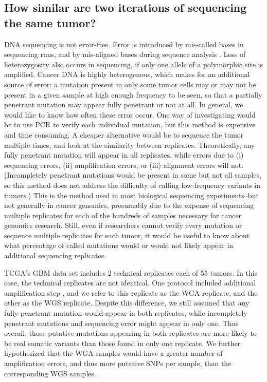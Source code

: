 \documentclass[11pt]{article} %
\begin{document}
\subsection*{How similar are two iterations of sequencing the same tumor?}


DNA sequencing is not error-free. Error is introduced by mis-called bases in sequencing runs, and by mis-aligned bases during sequence analysis \citep{seqerror}. Loss of heterozygosity also occurs in sequencing, if only one allele of a polymorphic site is amplified. Cancer DNA is highly heterogenous, which makes for an additional source of error: a mutation present in only some tumor cells may or may not be present in a given sample at high enough frequency to be seen, so that a partially penetrant mutation may appear fully penetrant or not at all. In general, we would like to know how often these error occur. One way of investigating would be to use PCR to verify each individual mutation, but this method is expensive and time consuming. A cheaper alternative would be to sequence the tumor multiple times, and look at the similarity between replicates. Theoretically, any fully penetrant mutation will appear in all replicates, while errors due to (i) sequencing errors, (ii) amplification errors, or (iii) alignment errors will not. (Incompletely penetrant mutations would be present in some but not all samples, so this method does not address the difficulty of calling low-frequency variants in tumors.) This is the method used in most biological sequencing experiments--but not generally in cancer genomics, presumably due to the expense of sequencing multiple replicates for each of the hundreds of samples necessary for cancer genomics research. Still, even if researchers cannot verify every mutation or sequence multiple replicates for each tumor, it would be useful to know about what percentage of called mutations would or would not likely appear in additional sequencing replicates.

TCGA's GBM data set includes 2 technical replicates each of 55 tumors. In this case, the technical replicates are not identical. One protocol included additional amplification step \citep{TCGA-GBM}, and we refer to this replicate as the WGA replicate, and the other as the WGS replicate. Despite this difference, we still assumed that any fully penetrant mutation would appear in both replicates, while incompletely penetrant mutations and sequencing error might appear in only one. Thus overall, those putative mutations appearing in both replicates are more likely to be real somatic variants than those found in only one replicate. We further hypothesized that the WGA samples would have a greater number of amplification errors, and thus more putative SNPs per sample, than the corresponding WGS samples. 
\end{document}
